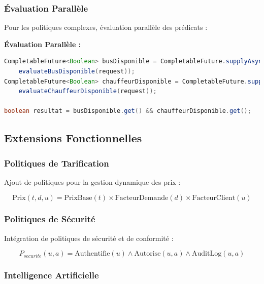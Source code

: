 \documentclass[12pt,a4paper]{article}
\begin{document}
    \subsubsection{Évaluation Parallèle}

    Pour les politiques complexes, évaluation parallèle des prédicats :

    \begin{codebox}
        \textbf{Évaluation Parallèle :}
        \begin{lstlisting}[language=Java]
CompletableFuture<Boolean> busDisponible = CompletableFuture.supplyAsync(() ->
    evaluateBusDisponible(request));
CompletableFuture<Boolean> chauffeurDisponible = CompletableFuture.supplyAsync(() ->
    evaluateChauffeurDisponible(request));

boolean resultat = busDisponible.get() && chauffeurDisponible.get();
        \end{lstlisting}
    \end{codebox}

    \subsection{Extensions Fonctionnelles}

    \subsubsection{Politiques de Tarification}

    Ajout de politiques pour la gestion dynamique des prix :

    \begin{equation}
        \text{Prix}(t, d, u) = \text{PrixBase}(t) \times \text{FacteurDemande}(d) \times \text{FacteurClient}(u)
    \end{equation}

    \subsubsection{Politiques de Sécurité}

    Intégration de politiques de sécurité et de conformité :

    \begin{equation}
        P_{securite}(u, a) = \text{Authentifie}(u) \wedge \text{Autorise}(u, a) \wedge \text{AuditLog}(u, a)
    \end{equation}

    \subsubsection{Intelligence Artificielle}
\end{document}
